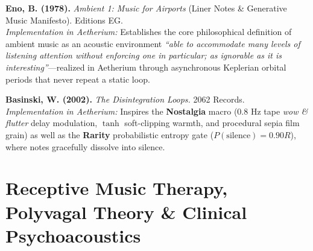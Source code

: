 \documentclass[11pt,oneside,openany]{book}
\begin{document}
\begin{enumerate}[label=\textbf{[\arabic*]}, resume]
  \item \textbf{Eno, B. (1978).} \textit{Ambient 1: Music for Airports} (Liner Notes \& Generative Music Manifesto). Editions EG.\\
  \textit{Implementation in Aetherium:} Establishes the core philosophical definition of ambient music as an acoustic environment \textit{``able to accommodate many levels of listening attention without enforcing one in particular; as ignorable as it is interesting''}---realized in Aetherium through asynchronous Keplerian orbital periods that never repeat a static loop.

  \item \textbf{Basinski, W. (2002).} \textit{The Disintegration Loops.} 2062 Records.\\
  \textit{Implementation in Aetherium:} Inspires the \textbf{Nostalgia} macro ($0.8\text{ Hz}$ tape \textit{wow \& flutter} delay modulation, $\tanh$ soft-clipping warmth, and procedural sepia film grain) as well as the \textbf{Rarity} probabilistic entropy gate ($P(\text{silence}) = 0.90 R$), where notes gracefully dissolve into silence.
\end{enumerate}

\section{Receptive Music Therapy, Polyvagal Theory \& Clinical Psychoacoustics}
\end{document}
